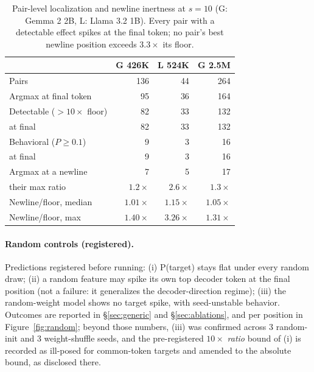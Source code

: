 \documentclass[11pt]{article}
\begin{document}
\begin{table}[h]
\centering\footnotesize
\begin{tabular}{@{}lrrr@{}}
\toprule
 & G 426K & L 524K & G 2.5M \\
\midrule
Pairs & 136 & 44 & 264 \\
Argmax at final token & 95 & 36 & 164 \\
Detectable ($>10\times$ floor) & 82 & 33 & 132 \\
\quad at final & 82 & 33 & 132 \\
Behavioral ($P\geq0.1$) & 9 & 3 & 16 \\
\quad at final & 9 & 3 & 16 \\
Argmax at a newline & 7 & 5 & 17 \\
\quad their max ratio & $1.2\times$ & $2.6\times$ & $1.3\times$ \\
Newline/floor, median & $1.01\times$ & $1.15\times$ & $1.05\times$ \\
Newline/floor, max & $1.40\times$ & $3.26\times$ & $1.31\times$ \\
\bottomrule
\end{tabular}
\caption{Pair-level localization and newline inertness at $s{=}10$ (G: Gemma 2 2B, L: Llama 3.2 1B). Every pair with a detectable effect spikes at the final token; no pair's best newline position exceeds $3.3\times$ its floor.}
\label{tab:pairs}
\end{table}

\paragraph{Random controls (registered).}
Predictions registered before running: (i) P(target) stays flat under every random draw; (ii) a random feature may spike its own top decoder token at the final position (not a failure: it generalizes the decoder-direction regime); (iii) the random-weight model shows no target spike, with seed-unstable behavior. Outcomes are reported in \S\ref{sec:generic} and \S\ref{sec:ablations}, and per position in Figure~\ref{fig:random}; beyond those numbers, (iii) was confirmed across 3 random-init and 3 weight-shuffle seeds, and the pre-registered $10\times$ \emph{ratio} bound of (i) is recorded as ill-posed for common-token targets and amended to the absolute bound, as disclosed there.
\end{document}
